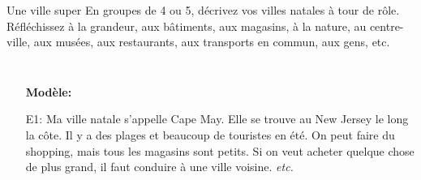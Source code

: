 \begin{frame}{Une ville super}
  En groupes de 4 ou 5, décrivez vos villes natales à tour de rôle.
  Réfléchissez à la grandeur, aux bâtiments, aux magasins, à la nature, au centre-ville, aux musées, aux restaurants, aux transports en commun, aux gens, etc.
  \begin{columns}
    \small
      \begin{itemize}
        \item[] \textbf{Modèle:}
        \item[E1:] Ma ville natale s'appelle Cape May. Elle se trouve au New Jersey le long la côte. Il y a des plages et beaucoup de touristes en été. On peut faire du shopping, mais tous les magasins sont petits. Si on veut acheter quelque chose de plus grand, il faut conduire à une ville voisine. \emph{etc.}
      \end{itemize}
  \end{columns}
\end{frame}